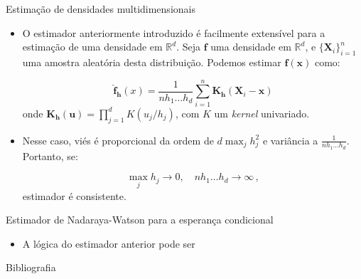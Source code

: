 \documentclass[11pt]{beamer}
\begin{document}
	\begin{frame}{Estimação de densidades multidimensionais}
		\begin{itemize}
			\item O estimador anteriormente introduzido é facilmente extensível para a estimação de uma densidade em $\mathbb{R}^d$. Seja $\boldsymbol{f}$ uma densidade em $\mathbb{R}^d$, e $\{\boldsymbol{X}_i\}_{i=1}^n$ uma amostra aleatória desta distribuição. Podemos estimar $\boldsymbol{f}(\boldsymbol{x})$ como:
			
			$$\hat{\boldsymbol{f}}_{\boldsymbol{h}}(x) = \frac{1}{nh_1\ldots h_d}\sum_{i=1}^n \boldsymbol{K}_{\boldsymbol{h}}\left(\boldsymbol{X}_i - \boldsymbol{x}\right)$$
			onde $\boldsymbol{K}_{\boldsymbol{h}}(\boldsymbol{u}) =\prod_{j=1}^d K(u_j/h_j)$, com $K$ um \textit{kernel} univariado.
			\item Nesse caso, viés é proporcional da ordem de $d \max_j h^2_j$ e variância a $\frac{1}{nh_1\ldots h_d}$. Portanto, se:
			
			$$\max_j h_j \to 0,\quad  nh_1\ldots h_d \to \infty \, ,$$
			estimador é consistente.
		\end{itemize}
	\end{frame}
	
	\begin{frame}{Estimador de Nadaraya-Watson para a esperança condicional}
		\begin{itemize}
			\item A lógica do estimador anterior pode ser 
		\end{itemize}
	\end{frame}
	
		\begin{frame}[allowframebreaks]{Bibliografia}
	\printbibliography

	\end{frame}
\end{document}
